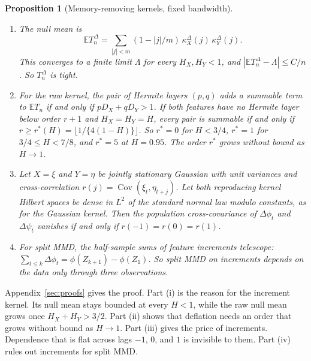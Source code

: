 \documentclass[11pt]{article}
\newtheorem{proposition}{Proposition}
\theoremstyle{remark}
\newcommand{\E}{\mathbb E}
\newcommand{\Cov}{\operatorname{Cov}}
\begin{document}
\begin{proposition}[Memory-removing kernels, fixed bandwidth]\label{prop:memkernel}
\begin{enumerate}[label=(\roman*),nosep]
\item The null mean is
\[
\E T_n^\Delta=\sum_{|j|<m}(1-|j|/m)\,\kappa^\Delta_X(j)\,\kappa^\Delta_Y(j).
\]
This converges to a finite limit $\Lambda$ for every $H_X,H_Y<1$, and $|\E T_n^\Delta-\Lambda|\le C/n$. So $T_n^\Delta$ is tight.
\item For the raw kernel, the pair of Hermite layers $(p,q)$ adds a summable term to $\E T_n$ if and only if $pD_X+qD_Y>1$. If both features have no Hermite layer below order $r+1$ and $H_X=H_Y=H$, every pair is summable if and only if $r\ge r^*(H)=\lfloor1/\{4(1-H)\}\rfloor$. So $r^*=0$ for $H<3/4$, $r^*=1$ for $3/4\le H<7/8$, and $r^*=5$ at $H=0.95$. The order $r^*$ grows without bound as $H\to1$.
\item Let $X=\xi$ and $Y=\eta$ be jointly stationary Gaussian with unit variances and cross-correlation $r(j)=\Cov(\xi_t,\eta_{t+j})$. Let both reproducing kernel Hilbert spaces be dense in $L^2$ of the standard normal law modulo constants, as for the Gaussian kernel. Then the population cross-covariance of $\Delta\phi_t$ and $\Delta\psi_t$ vanishes if and only if $r(-1)=r(0)=r(1)$.
\item For split MMD, the half-sample sums of feature increments telescope: $\sum_{t\le k}\Delta\phi_t=\phi(Z_{k+1})-\phi(Z_1)$. So split MMD on increments depends on the data only through three observations.
\end{enumerate}
\end{proposition}

Appendix~\ref{sec:proofs} gives the proof. Part (i) is the reason for the increment kernel. Its null mean stays bounded at every $H<1$, while the raw null mean grows once $H_X+H_Y>3/2$. Part (ii) shows that deflation needs an order that grows without bound as $H\to1$. Part (iii) gives the price of increments. Dependence that is flat across lags $-1$, $0$, and $1$ is invisible to them. Part (iv) rules out increments for split MMD.
\end{document}
